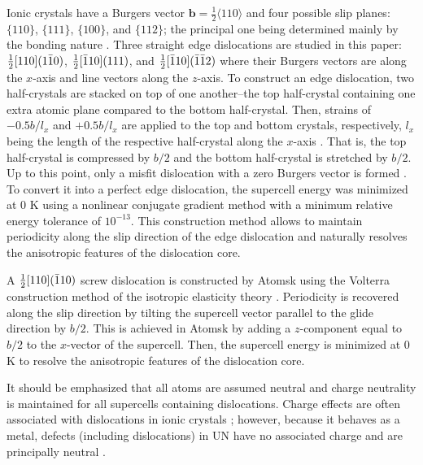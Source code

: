 \documentclass[applsci,article,submit,pdftex,moreauthors]{Definitions/mdpi}
\newcommand{\?}{\stackrel{?}{=}}
\begin{document}
Ionic crystals have a Burgers vector $\mathbf{b} = \frac{1}{2} \langle 110 \rangle$ and four possible slip planes: $\{ 110 \}$, $\{ 111 \}$, $\{ 100 \}$, and $\{ 112 \}$; the principal one being determined mainly by the bonding nature \cite{Hull2011, Yadav2014}. Three straight edge dislocations are studied in this paper: $\frac{1}{2} [ 110 ] ( 1 \Bar{1} 0 )$, $\frac{1}{2} [ \Bar{1} 1 0 ] ( 111 )$, and $\frac{1}{2} [ \Bar{1} 10 ] ( \Bar{1} \Bar{1} 2 )$ where their Burgers vectors are along the $x$-axis and line vectors along the $z$-axis. To construct an edge dislocation, two half-crystals are stacked on top of one another--the top half-crystal containing one extra atomic plane compared to the bottom half-crystal. Then, strains of $-0.5b/l_x$ and $+0.5b/l_x$ are applied to the top and bottom crystals, respectively, $l_x$ being the length of the respective half-crystal along the $x$-axis \cite{Osetsky2003}. That is, the top half-crystal is compressed by $b/2$ and the bottom half-crystal is stretched by $b/2$. Up to this point, only a misfit dislocation with a zero Burgers vector is formed \cite{Osetsky2003}. To convert it into a perfect edge dislocation, the supercell energy was minimized at 0 K using a nonlinear conjugate gradient method with a minimum relative energy tolerance of $10^{-13}$. This construction method allows to maintain periodicity along the slip direction of the edge dislocation and naturally resolves the anisotropic features of the dislocation core.

A $\frac{1}{2} [ 110 ] ( \Bar{1} 1 0 )$ screw dislocation is constructed by Atomsk using the Volterra construction method of the isotropic elasticity theory \cite{Hull2011}. Periodicity is recovered along the slip direction by tilting the supercell vector parallel to the glide direction by $b/2$. This is achieved in Atomsk by adding a $z$-component equal to $b/2$ to the $x$-vector of the supercell. Then, the supercell energy is minimized at 0 K to resolve the anisotropic features of the dislocation core.

It should be emphasized that all atoms are assumed neutral and charge neutrality is maintained for all supercells containing dislocations. Charge effects are often associated with dislocations in ionic crystals \cite{Smoluchowski1966}; however, because it behaves as a metal, defects (including dislocations) in UN have no associated charge and are principally neutral \cite{Cooper2023}.

\end{document}
